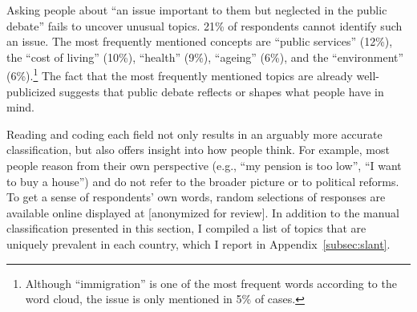 \documentclass[12pt,english]{article}
\begin{document}
Asking people about ``an issue important to them but neglected in the public debate'' fails to uncover unusual topics. 21\% of respondents cannot identify such an issue. %
The most frequently mentioned concepts are ``public services'' (12\%), the ``cost of living'' (10\%), ``health'' (9\%), ``ageing'' (6\%), and the ``environment'' (6\%).\footnote{Although ``immigration'' is one of the most frequent words according to the word cloud, the issue is only mentioned in 5\% of cases.} 
The fact that the most frequently mentioned topics are already well-publicized suggests that public debate reflects or shapes what people have in mind. %

Reading and coding each field not only results in an arguably more accurate classification, but also offers insight into how people think. 
For example, most people reason from their own perspective (e.g., ``my pension is too low'', ``I want to buy a house'') and do not refer to the broader picture or to political reforms. %
To get a sense of respondents' own words, random selections of responses are available online displayed at [anonymized for review]. %
In addition to the manual classification presented in this section, I compiled a list of topics that are uniquely prevalent in each country, which I report in Appendix~\ref{subsec:slant}. 
\end{document}
